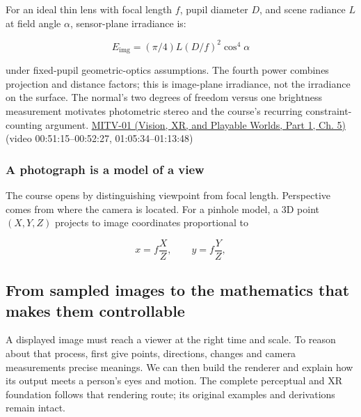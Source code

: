 For an ideal thin lens with focal length \(f\), pupil diameter \(D\), and scene radiance \(L\) at field angle \(\alpha\), sensor-plane irradiance is:

\[E_{\mathrm{img}}=(\pi/4)L(D/f)^2\cos^4\alpha\]

under fixed-pupil geometric-optics assumptions. The fourth power combines projection and distance factors; this is image-plane irradiance, not the irradiance on the surface. The normal's two degrees of freedom versus one brightness measurement motivates photometric stereo and the course's recurring constraint-counting argument. \href{../07-Vision-XR-and-Playable-Worlds-P01/main.pdf\#nameddest=04-visual-computing-ii-ch036-mitv-01---introduction-to-machine-vision}{MITV-01 (Vision, XR, and Playable Worlds, Part 1, Ch. 5)} (video 00:51:15--00:52:27, 01:05:34--01:13:48)

\subsubsection{A photograph is a model of a view}\label{03-visual-computing-i-ch001-a-photograph-is-a-model-of-a-view}

\hypertarget{03-visual-computing-i-ch001-a-photograph-is-a-model-of-a-view}{}

The course opens by distinguishing viewpoint from focal length. Perspective comes from where the camera is located. For a pinhole model, a 3D point \((X,Y,Z)\) projects to image coordinates proportional to

\[
x=f\frac{X}{Z},\qquad y=f\frac{Y}{Z},
\]

\subsection{From sampled images to the mathematics that makes them controllable}\label{03-visual-computing-i-ch001-from-sampled-images-to-the-mathematics-that-makes-them-controllable}

\hypertarget{03-visual-computing-i-ch001-from-sampled-images-to-the-mathematics-that-makes-them-controllable}{}

A displayed image must reach a viewer at the right time and scale. To reason about that process, first give points, directions, changes and camera measurements precise meanings. We can then build the renderer and explain how its output meets a person's eyes and motion. The complete perceptual and XR foundation follows that rendering route; its original examples and derivations remain intact.

